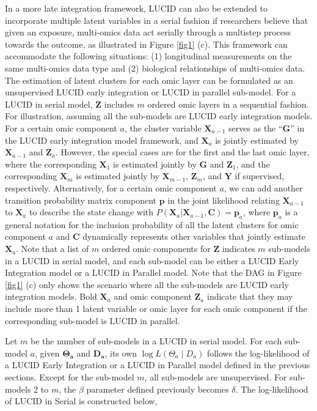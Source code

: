 In a more late integration framework, LUCID can also be extended to incorporate multiple latent variables in a serial fashion if researchers believe that given an exposure, multi-omics data act serially through a multistep process towards the outcome, as illustrated in Figure \ref{fig1} (c). This framework can accommodate the following situations: (1) longitudinal measurements on the same multi-omics data type and (2) biological relationships of multi-omics data. The estimation of latent clusters for each omic layer can be formulated as an unsupervised LUCID early integration or LUCID in parallel sub-model. For a LUCID in serial model, $\bm Z$ includes $m$ ordered omic layers in a sequential fashion. For illustration, assuming all the sub-models are LUCID early integration models. For a certain omic component $a$, the cluster variable $\bm X_{a - 1}$ serves as the “$\bm G$” in the LUCID early integration model framework, and $\bm X_a$ is jointly estimated by $\bm X_{a - 1}$ and $\bm Z_a$. However, the special cases are for the first and the last omic layer, where the corresponding $\bm X_{1}$ is estimated jointly by $\bm G$ and $\bm Z_1$, and the corresponding $\bm X_{m}$ is estimated jointly by $\bm X_{m - 1}$, $\bm Z_m$, and $\bm Y$ if supervised, respectively. Alternatively, for a certain omic component $a$, we can add another transition probability matrix component $\bm p$ in the joint likelihood relating $\bm X_{a - 1}$ to $\bm X_a$ to describe the state change with $P(\bm X_a|\bm X_{a - 1}, \bm C) = \bm p_a$, where $\bm p_a$ is a general notation for the inclusion probability of all the latent clusters for omic component $a$ and $\bm C$ dynamically represents other variables that jointly estimate $\bm X_{a}$. Note that a list of $m$ ordered omic components for $\bm Z$ indicates $m$ sub-models in a LUCID in serial model, and each sub-model can be either a LUCID Early Integration model or a LUCID in Parallel model. Note that the DAG in Figure \ref{fig1} (c) only shows the scenario where all the sub-models are LUCID early integration models. Bold $\bm X_{a}$ and omic component $\bm Z_a$ indicate that they may include more than 1 latent variable or omic layer for each omic component if the corresponding sub-model is LUCID in parallel.

Let $m$ be the number of sub-models in a LUCID in serial model. For each sub-model $a$, given $\bm{\Theta_a}$ and $\bm{D_a}$, its own $\log L({\Theta_a} \mid {D_a})$ follows the log-likelihood of a LUCID Early Integration or a LUCID in Parallel model defined in the previous sections. Except for the sub-model $m$, all sub-models are unsupervised. For sub-models 2 to $m$, the $\beta$ parameter defined previously becomes $\delta$. The log-likelihood of LUCID in Serial is constructed below,

